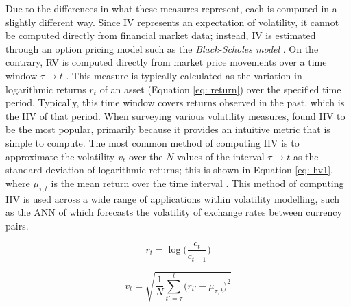 \documentclass[a4paper, 11pt]{report}
\begin{document}
    Due to the differences in what these measures represent, each is computed in a slightly different way. Since IV represents an expectation of volatility, it cannot be computed directly from financial market data; instead, IV is estimated through an option pricing model such as the \emph{Black-Scholes model} \citep{black-1973}. On the contrary, RV is computed directly from market price movements over a time window $\tau \to t$ \citep{ge-2022}. This measure is typically calculated as the variation in logarithmic returns $r_t$ of an asset (Equation \ref{eq: return}) over the specified time period. Typically, this time window covers returns observed in the past, which is the HV of that period. When surveying various volatility measures, \citet{ge-2022} found HV to be the most popular, primarily because it provides an intuitive metric that is simple to compute. The most common method of computing HV is to approximate the volatility $v_t$ over the $N$ values of the interval $\tau \to t$ as the standard deviation of logarithmic returns; this is shown in Equation \ref{eq: hv1}, where $\mu_{\tau, t}$ is the mean return over the time interval \citep{ge-2022}. This method of computing HV is used across a wide range of applications within volatility modelling, such as the ANN of \citet{lahmiri-2017} which forecasts the volatility of exchange rates between currency pairs.

    \begin{equation}
        \label{eq: return}
        r_t = \log \Bigg( \frac{c_t}{c_{t-1}} \Bigg)
    \end{equation}

    \begin{equation}
        \label{eq: hv1}
        v_t = \sqrt{ \frac{1}{N} \sum_{t' = \tau}^{t} \big( r_{t'} - \mu_{\tau, t} \big)^2 }
    \end{equation}
\end{document}
